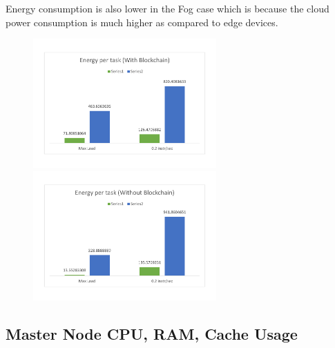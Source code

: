 \documentclass[AMA,STIX1COL]{WileyNJD-v2}
\begin{document}
Energy consumption is also lower in the Fog case which is because the cloud power consumption is much higher as compared to edge devices.
\begin{figure}[h]
\centering
\includegraphics[width=7cm]{g31} \ \ \ \ \ \ \ \ \ \ \       
\includegraphics[width=7cm]{g32}
\end{figure}

\subsection{Master Node CPU, RAM, Cache Usage}
\end{document}
